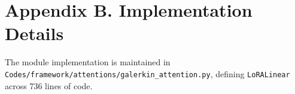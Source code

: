 \section*{Appendix B. Implementation Details}
The module implementation is maintained in \texttt{Codes/framework/attentions/galerkin\_attention.py}, defining \texttt{LoRALinear} across 736 lines of code.
